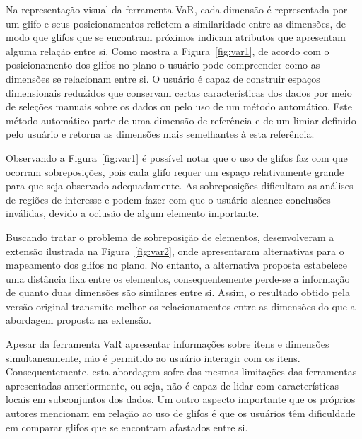 Na representação visual da ferramenta VaR, cada dimensão é
representada por um glifo e seus posicionamentos refletem a
similaridade entre as dimensões, de modo que glifos que se
encontram próximos indicam atributos que apresentam alguma
relação entre si. Como mostra a Figura~\ref{fig:var1}, de
acordo com o posicionamento dos glifos no plano o usuário
pode compreender como as dimensões se relacionam entre si. O
usuário é capaz de construir espaços dimensionais reduzidos
que conservam certas características dos dados por meio de
seleções manuais sobre os dados ou pelo uso de um método automático.
Este método automático parte de uma dimensão de referência e
de um limiar definido pelo usuário e retorna as dimensões
mais semelhantes à esta referência.

Observando a Figura~\ref{fig:var1} é possível notar que o
uso de glifos faz com que ocorram sobreposições, pois cada
glifo requer um espaço relativamente grande para que seja
observado adequadamente.  As sobreposições dificultam as
análises de regiões de interesse e podem fazer com que o
usuário alcance conclusões inválidas, devido a oclusão de
algum elemento importante.  

Buscando tratar o problema de sobreposição de elementos,
\citet{Yang2007} desenvolveram a extensão ilustrada na
Figura~\ref{fig:var2}, onde apresentaram alternativas para o
mapeamento dos glifos no plano. No entanto, a alternativa
proposta estabelece uma distância fixa entre os elementos,
consequentemente perde-se a informação de quanto duas
dimensões são similares entre si. Assim, o resultado obtido
pela versão original transmite melhor os relacionamentos entre
as dimensões do que a abordagem proposta na extensão. 

Apesar da ferramenta VaR apresentar informações sobre itens
e dimensões simultaneamente, não é permitido ao usuário
interagir com os itens. Consequentemente, esta abordagem
sofre das mesmas limitações das ferramentas apresentadas
anteriormente, ou seja, não é capaz de lidar com  
características locais em subconjuntos dos dados. Um outro
aspecto importante que os próprios autores mencionam em
relação ao uso de glifos é que os usuários têm dificuldade
em comparar glifos que se encontram afastados entre si. 

